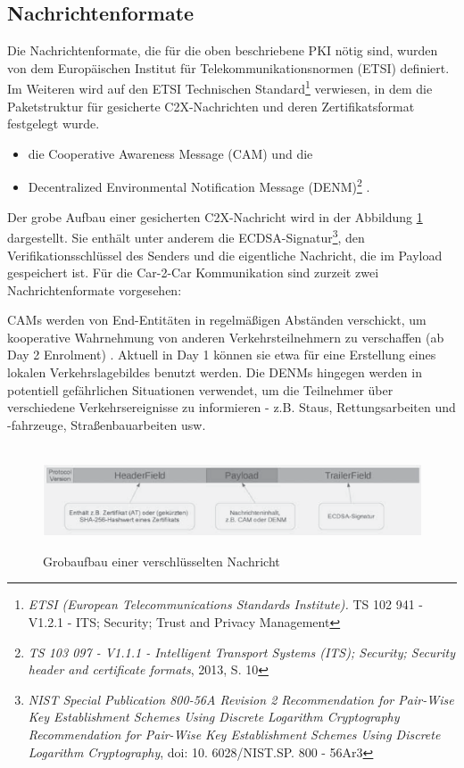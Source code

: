 \subsection{Nachrichtenformate}
\label{sec:FirstContentSection:SecondSubSection}

Die Nachrichtenformate, die für die oben beschriebene PKI nötig sind, wurden von dem Europäischen Institut für Telekommunikationsnormen (ETSI) definiert. Im Weiteren wird auf den ETSI Technischen Standard\footnote{\emph{ETSI (European Telecommunications Standards Institute).} TS 102 941 - V1.2.1 - ITS; Security; Trust and Privacy Management}\nocite{ETSI2018} verwiesen, in dem die Paketstruktur für gesicherte C2X-Nachrichten und deren Zertifikatsformat festgelegt wurde. 

\begin{itemize}
	\item die Cooperative Awareness Message (CAM) und die 
	\item Decentralized Environmental Notification Message (DENM)\footnote{\emph{TS 103 097 - V1.1.1 - Intelligent Transport Systems (ITS); Security; Security header and certificate formats}, 2013, S. 10} \nocite{ETSI2013}.
\end{itemize}

Der grobe Aufbau einer gesicherten C2X-Nachricht wird in der Abbildung \ref{fig:nachrichtenaufbau} dargestellt. Sie enthält unter anderem die ECDSA-Signatur\footnote{\emph{NIST Special Publication 800-56A Revision 2 Recommendation for Pair-Wise Key Establishment Schemes Using Discrete Logarithm Cryptography Recommendation for Pair-Wise Key Establishment Schemes Using Discrete Logarithm Cryptography}, doi: 10. 6028/NIST.SP. 800 - 56Ar3}\nocite{Barker2013}, den Verifikationsschlüssel des Senders und die eigentliche Nachricht, die im Payload gespeichert ist. Für die Car-2-Car Kommunikation sind zurzeit zwei Nachrichtenformate vorgesehen:

CAMs werden von End-Entitäten in regelmäßigen Abständen verschickt, um kooperative Wahrnehmung von anderen Verkehrsteilnehmern zu verschaffen (ab Day 2 Enrolment) . Aktuell in Day 1 können sie etwa für eine Erstellung eines lokalen Verkehrslagebildes benutzt werden. Die DENMs hingegen werden in potentiell gefährlichen Situationen verwendet, um die Teilnehmer über verschiedene Verkehrsereignisse zu informieren - z.B. Staus, Rettungsarbeiten und -fahrzeuge, Straßenbauarbeiten usw. 

\begin{figure}
	\centering
 	\includegraphics[width=0.7\linewidth]{images/Nachrichtenaufbau}
	\caption[Grobaufbau einer verschlüsselten Nachricht]{Grobaufbau einer verschlüsselten Nachricht\footnotemark}
	\label{fig:nachrichtenaufbau}
\end{figure}

